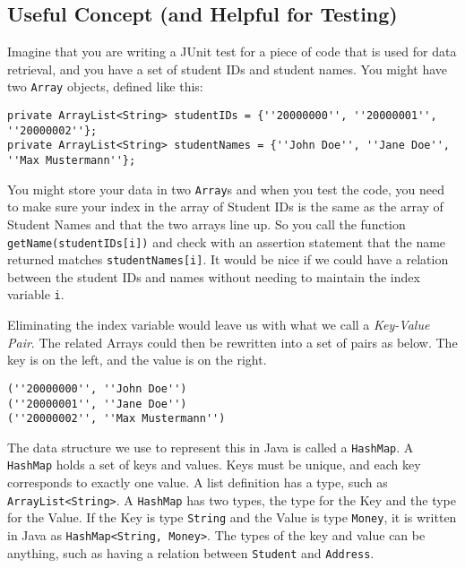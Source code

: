 \subsection*{Useful Concept (and Helpful for Testing)}
Imagine that you are writing a JUnit test for a piece of code that is used for data retrieval, and you have a set of student IDs and student names. You might have two \texttt{Array} objects, defined like this:

\vspace{-1.5em}
\begin{verbatim}
private ArrayList<String> studentIDs = {''20000000'', ''20000001'', ''20000002''};
private ArrayList<String> studentNames = {''John Doe'', ''Jane Doe'', ''Max Mustermann''};
\end{verbatim}
\vspace{-1.5em}

You might store your data in two \texttt{Array}s and when you test the code, you need to make sure your index in the array of Student IDs is the same as the array of Student Names and that the two arrays line up. So you call the function \texttt{getName(studentIDs[i])} and check with an assertion statement that the name returned matches \texttt{studentNames[i]}. It would be nice if we could have a relation between the student IDs and names without needing to maintain the index variable \texttt{i}.

Eliminating the index variable would leave us with what we call a \textit{Key-Value Pair}. The related Arrays could then be rewritten into a set of pairs as below. The key is on the left, and the value is on the right.

\vspace{-1.5em}
\begin{verbatim}
(''20000000'', ''John Doe'')
(''20000001'', ''Jane Doe'')
(''20000002'', ''Max Mustermann'')
\end{verbatim}
\vspace{-1.5em}

The data structure we use to represent this in Java is called a \texttt{HashMap}. A \texttt{HashMap} holds a set of keys and values. Keys must be unique, and each key corresponds to exactly one value. A list definition has a type, such as \texttt{ArrayList<String>}. A \texttt{HashMap} has two types, the type for the Key and the type for the Value. If the Key is type \texttt{String} and the Value is type \texttt{Money}, it is written in Java as \texttt{HashMap<String, Money>}. The types of the key and value can be anything, such as having a relation between \texttt{Student} and \texttt{Address}.


